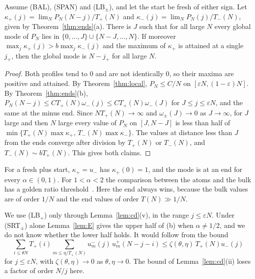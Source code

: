 \begin{corollary}\label{cor:mode}
Assume (BAL), (SPAN) and (LB$_\pm$), and let the start be fresh of either sign.
Let $\kappa_\plus(j)=\lim_NP_N(N-j)/T_\plus(N)$ and $\kappa_\minus(j)=\lim_NP_N(j)/T_\minus(N)$,
given by Theorem~\ref{thm:ends}(a). There is $J$ such that for all large $N$ every global
mode of $P_N$ lies in $\{0,\dots,J\}\cup\{N-J,\dots,N\}$. If moreover
$\max_j\kappa_\plus(j)>b\max_j\kappa_\minus(j)$ and the maximum of $\kappa_\plus$ is attained at a
single $j_+$, then the global mode is $N-j_+$ for all large $N$.
\end{corollary}

\begin{proof}
Both profiles tend to $0$ and are not identically $0$, so their maxima are positive and
attained. By Theorem~\ref{thm:local}, $P_N\le C/N$ on $[\varepsilon N,(1-\varepsilon)N]$. By
Theorem~\ref{thm:ends}(b), $P_N(N-j)\le CT_\plus(N)\omega_\minus(j)\le CT_\plus(N)\omega_\minus(J)$
for $J\le j\le\varepsilon N$, and the same at the minus end. Since $NT_\plus(N)\to\infty$ and
$\omega_\pm(J)\to0$ as $J\to\infty$, for $J$ large and then $N$ large every value of $P_N$
on $[J,N-J]$ is less than half of
$\min\{T_\plus(N)\max\kappa_\plus,\,T_\minus(N)\max\kappa_\minus\}$. The values at distance
less than $J$ from the ends converge after division by $T_\plus(N)$ or $T_\minus(N)$, and
$T_\minus(N)\sim bT_\plus(N)$. This gives both claims.
\end{proof}

For a fresh plus start, $\kappa_\plus=u_\minus$ has $\kappa_\plus(0)=1$, and the mode is at
an end for every $\alpha\in(0,1)$. For $1<\alpha<2$ the comparison between the atoms and the
bulk has a golden ratio threshold~\cite{paperF}. Here the end always wins, because the
bulk values are of order $1/N$ and the end values of order $T(N)\gg1/N$.

\begin{remark}\label{rem:M0}
We use (LB$_\plus$) only through Lemma~\ref{lem:cd}(v), in the range $j\le\varepsilon N$. Under
(SRT$_\pm$) alone Lemma~\ref{lem:E} gives the upper half of (b) when $\alpha\ne1/2$, and we do
not know whether the lower half holds. It would follow from the bound
\[
 \sum_{i\le\theta N}T_\plus(i)\sum_{m\le\eta/T_\plus(N)}u^\minus_m(j)\,u^\plus_m(N-j-i)\le\zeta(\theta,\eta)\,T_\plus(N)u_\minus(j)
\]
for $j\le\varepsilon N$, with $\zeta(\theta,\eta)\to0$ as $\theta,\eta\to0$. The bound of
Lemma~\ref{lem:cd}(ii) loses a factor of order $N/j$ here.
\end{remark}
